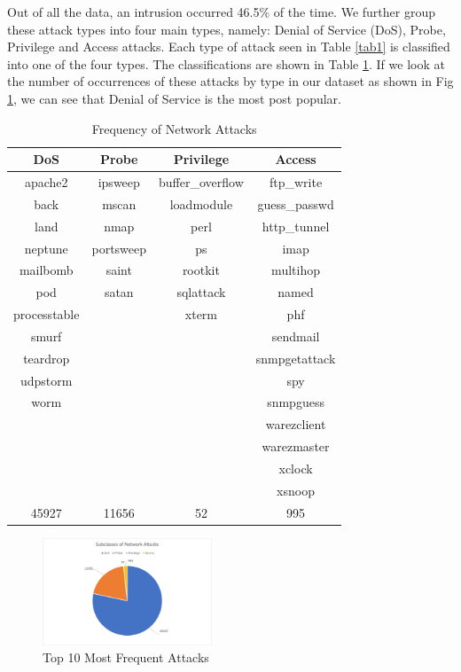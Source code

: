 \documentclass[conference]{IEEEtran}
\begin{document}
Out of all the data, an intrusion occurred 46.5\% of the time. We further group these attack types into four main types, namely: Denial of Service (DoS), Probe, Privilege and Access attacks. Each type of attack seen in Table \ref{tab1} is classified into one of the four types. The classifications are shown in Table \ref{tab2}. If we look at the number of occurrences of these attacks by type in our dataset as shown in Fig \ref{fig2}, we can see that Denial of Service is the most post popular.

\begin{table}[htbp]
\caption{Frequency of Network Attacks}
\begin{center}
\begin{tabular}{|c|c|c|c|}
\hline
DoS	&	Probe	&	Privilege	&	Access	\\
\hline
apache2	&	ipsweep	&	buffer\_overflow	&	ftp\_write	\\
back	&	mscan	&	loadmodule	&	guess\_passwd	\\
land	&	nmap	&	perl	&	http\_tunnel	\\
neptune	&	portsweep	&	ps	&	imap	\\
mailbomb	&	saint	&	rootkit	&	multihop	\\
pod	&	satan	&	sqlattack	&	named	\\
processtable	&		&	xterm	&	phf	\\
smurf	&		&		&	sendmail	\\
teardrop	&		&		&	snmpgetattack	\\
udpstorm	&		&		&	spy	\\
worm	&		&		&	snmpguess	\\
	&		&		&	warezclient	\\
	&		&		&	warezmaster	\\
	&		&		&	xclock	\\
	&		&		&	xsnoop	\\
\hline
45927 &	 11656  &	 52  &	995
	\\
\hline
\end{tabular}
\label{tab2}
\end{center}
\end{table}

\begin{figure}[htbp]
\centerline{\includegraphics[height= 160 pt, width=0.45\textwidth]{External/Fig-Subclasses-of-Attacks.PNG}}
\caption{Top 10 Most Frequent Attacks}
\label{fig2}
\end{figure}
\end{document}
